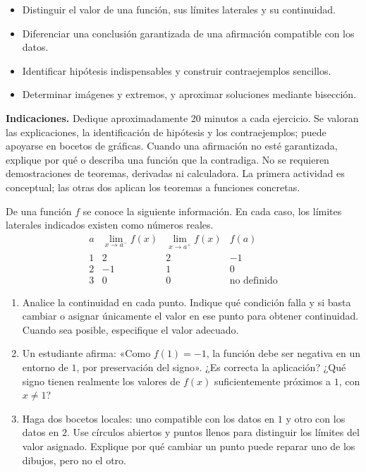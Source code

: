 \documentclass[10pt,a4paper]{article}
\begin{document}

\begin{objetivos}
\begin{itemize}
  \item Distinguir el valor de una función, sus límites laterales y su continuidad.
  \item Diferenciar una conclusión garantizada de una afirmación compatible con los datos.
  \item Identificar hipótesis indispensables y construir contraejemplos sencillos.
  \item Determinar imágenes y extremos, y aproximar soluciones mediante bisección.
\end{itemize}
\end{objetivos}

\noindent\textbf{Indicaciones.} Dedique aproximadamente 20 minutos a cada ejercicio. Se valoran las explicaciones, la identificación de hipótesis y los contraejemplos; puede apoyarse en bocetos de gráficas. Cuando una afirmación no esté garantizada, explique por qué o describa una función que la contradiga. No se requieren demostraciones de teoremas, derivadas ni calculadora. La primera actividad es conceptual; las otras dos aplican los teoremas a funciones concretas.

\begin{ejerciciopractica}
  De una función $f$ se conoce la siguiente información. En cada caso, los límites laterales indicados existen como números reales.
  \[
    \begin{array}{c|c|c|c}
      a&\lim_{x\to a^-}f(x)&\lim_{x\to a^+}f(x)&f(a)\\ \hline
      1&2&2&-1\\
      2&-1&1&0\\
      3&0&0&\text{no definido}
    \end{array}
  \]
  \begin{enumerate}
    \item Analice la continuidad en cada punto. Indique qué condición falla y si basta cambiar o asignar únicamente el valor en ese punto para obtener continuidad. Cuando sea posible, especifique el valor adecuado.
    \item Un estudiante afirma: «Como $f(1)=-1$, la función debe ser negativa en un entorno de $1$, por preservación del signo». ¿Es correcta la aplicación? ¿Qué signo tienen realmente los valores de $f(x)$ suficientemente próximos a $1$, con $x\neq1$?
    \item Haga dos bocetos locales: uno compatible con los datos en $1$ y otro con los datos en $2$. Use círculos abiertos y puntos llenos para distinguir los límites del valor asignado. Explique por qué cambiar un punto puede reparar uno de los dibujos, pero no el otro.
  \end{enumerate}
\end{ejerciciopractica}
\end{document}

